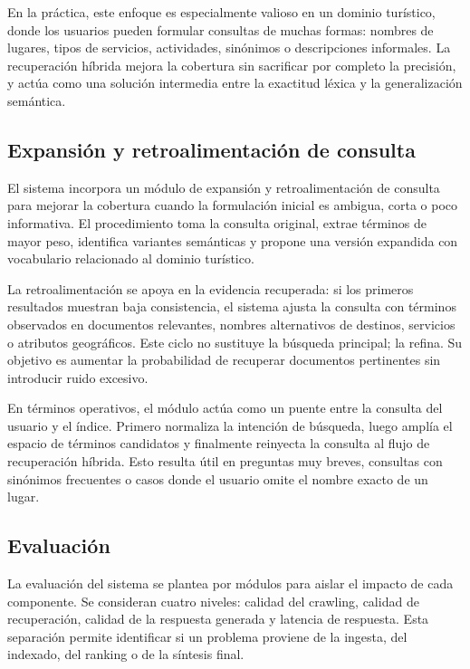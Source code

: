 \documentclass{llncs}
\begin{document}
En la práctica, este enfoque es especialmente valioso en un dominio turístico, donde los usuarios pueden formular consultas de muchas formas: nombres de lugares, tipos de servicios, actividades, sinónimos o descripciones informales. La recuperación híbrida mejora la cobertura sin sacrificar por completo la precisión, y actúa como una solución intermedia entre la exactitud léxica y la generalización semántica.

\subsection{Expansión y retroalimentación de consulta}

El sistema incorpora un módulo de expansión y retroalimentación de consulta para mejorar la cobertura cuando la formulación inicial es ambigua, corta o poco informativa. El procedimiento toma la consulta original, extrae términos de mayor peso, identifica variantes semánticas y propone una versión expandida con vocabulario relacionado al dominio turístico.

La retroalimentación se apoya en la evidencia recuperada: si los primeros resultados muestran baja consistencia, el sistema ajusta la consulta con términos observados en documentos relevantes, nombres alternativos de destinos, servicios o atributos geográficos. Este ciclo no sustituye la búsqueda principal; la refina. Su objetivo es aumentar la probabilidad de recuperar documentos pertinentes sin introducir ruido excesivo.

En términos operativos, el módulo actúa como un puente entre la consulta del usuario y el índice. Primero normaliza la intención de búsqueda, luego amplía el espacio de términos candidatos y finalmente reinyecta la consulta al flujo de recuperación híbrida. Esto resulta útil en preguntas muy breves, consultas con sinónimos frecuentes o casos donde el usuario omite el nombre exacto de un lugar.

\subsection{Evaluación}

La evaluación del sistema se plantea por módulos para aislar el impacto de cada componente. Se consideran cuatro niveles: calidad del crawling, calidad de recuperación, calidad de la respuesta generada y latencia de respuesta. Esta separación permite identificar si un problema proviene de la ingesta, del indexado, del ranking o de la síntesis final.
\end{document}
